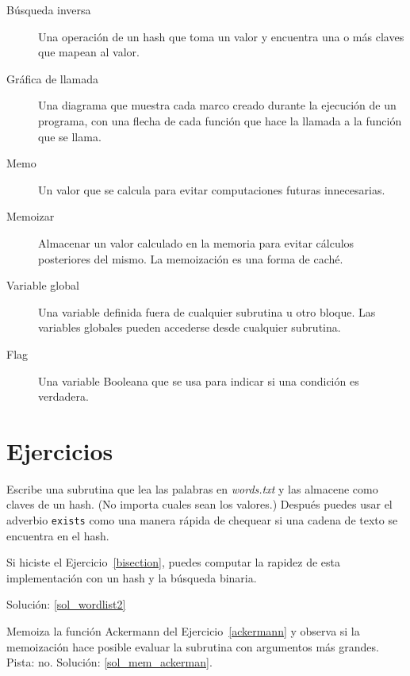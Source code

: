 \begin{description}
\item[Búsqueda inversa] Una operación de un hash que toma un valor 
y encuentra una o más claves que mapean al valor.

\item[Gráfica de llamada] Una diagrama que muestra cada marco creado 
durante la ejecución de un programa, con una flecha de cada función
que hace la llamada a la función que se llama.

\item[Memo] Un valor que se calcula para evitar computaciones futuras
innecesarias.

\item[Memoizar] Almacenar un valor calculado en la memoria para
evitar cálculos posteriores del mismo. La memoización es una forma
de caché.

\item[Variable global]  Una variable definida fuera de cualquier subrutina
u otro bloque. Las variables globales pueden accederse desde cualquier
subrutina.

\item[Flag] Una variable Booleana que se usa para indicar si una 
condición es verdadera.

\end{description}


\section{Ejercicios}

\begin{exercise}
\label{wordlist2}

Escribe una subrutina que lea las palabras en \emph{words.txt}
y las almacene como claves de un hash. (No importa cuales sean los
valores.) Después puedes usar el adverbio {\tt exists} como una manera
rápida de chequear si una cadena de texto se encuentra en el hash.

Si hiciste el Ejercicio~\ref{bisection}, puedes computar la
rapidez de esta implementación con un hash y la búsqueda binaria.

Solución: \ref{sol_wordlist2}

\end{exercise}


\begin{exercise}
\label{mem_ackerman}
Memoiza la función Ackermann del Ejercicio~\ref{ackermann}
y observa si la memoización hace posible evaluar la subrutina
con argumentos más grandes. Pista: no.
Solución: \ref{sol_mem_ackerman}.

\end{exercise}




